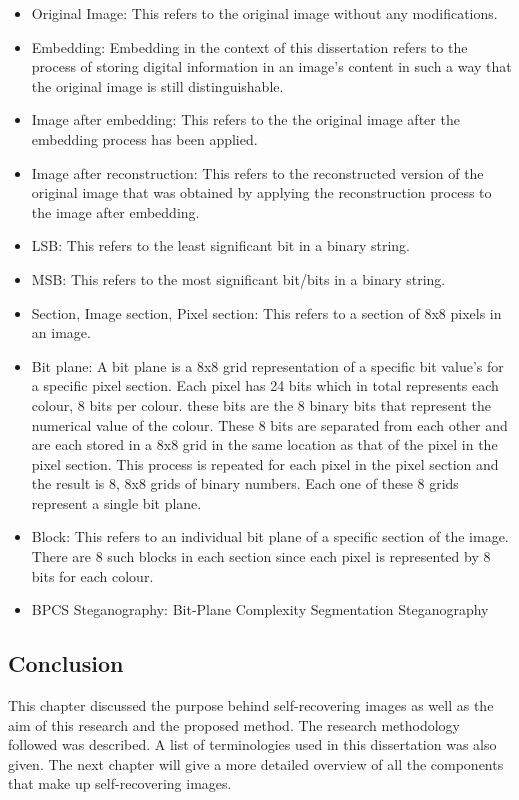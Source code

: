 \documentclass[12pt]{article}
\begin{document}
\begin{itemize}
  \item Original Image: This refers to the original image without any modifications.
  \item Embedding: Embedding in the context of this dissertation refers to the process of storing digital information in an image's content in such a way that the original image is still distinguishable.
  \item Image after embedding: This refers to the the original image after the embedding process has been applied.
  \item Image after reconstruction: This refers to the reconstructed version of the original image that was obtained by applying the reconstruction process to the image after embedding.
  \item LSB: This refers to the least significant bit in a binary string.
  \item MSB: This refers to the most significant bit/bits in a binary string.
  \item Section, Image section, Pixel section: This refers to a section of 8x8 pixels in an image.
  \item Bit plane: A bit plane is a 8x8 grid representation of a specific bit value's for a specific pixel section. Each pixel has 24 bits which in total represents each colour, 8 bits per colour. these bits are the 8 binary bits that represent the numerical value of the colour. These 8 bits are separated from each other and are each stored in a 8x8 grid in the same location as that of the pixel in the pixel section. This process is repeated for each pixel in the pixel section and the result is 8, 8x8 grids of binary numbers. Each one of these 8 grids represent a single bit plane. 
  \item Block: This refers to an individual bit plane of a specific section of the image. There are 8 such blocks in each section since each pixel is represented by 8 bits for each colour.
  \item BPCS Steganography: Bit-Plane Complexity Segmentation Steganography
\end{itemize}

\subsection{Conclusion}
This chapter discussed the purpose behind self-recovering images as well as the aim of this research and the proposed method. 
The research methodology followed was described. A list of terminologies used in this dissertation was also given.
The next chapter will give a more detailed overview of all the components that make up self-recovering images. 
\end{document}
